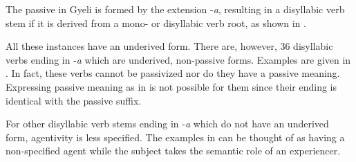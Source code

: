 The passive in Gyeli is formed by the extension -{\itshape a}, resulting in a disyllabic verb stem if it is derived from a mono- or disyllabic verb root, as shown in .




All these instances have an underived form. There are, however, 36 disyllabic verbs ending in -{\itshape a} which are underived, non-passive forms. Examples are given in . In fact, these verbs cannot be passivized nor do they have a passive meaning. Expressing passive meaning as in  is not possible for them since their ending is identical with the passive suffix.



For other disyllabic verb stems ending in -{\itshape a} which do not have an underived form, agentivity is less specified. The examples in   can be thought of as having a non-specified agent while the subject takes the semantic role of an experiencer.



